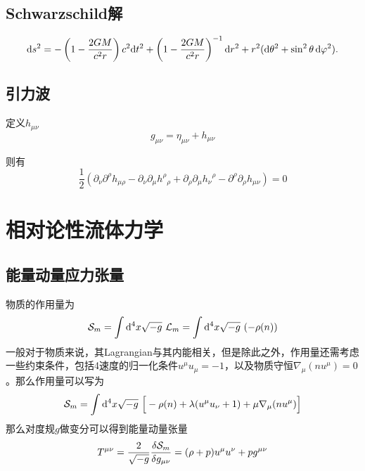 \documentclass[a4paper]{report}
\begin{document}
\section{Schwarzschild解}

\begin{equation}
\mathrm{d} s^2 = -\left(1 - \frac{2GM}{c^2 r}\right) c^2 \mathrm{d} t^2
+ \left(1 - \frac{2GM}{c^2 r}\right)^{-1} \mathrm{d} r^2
+ r^2 (\mathrm{d}\theta^2 + \sin^2\theta\, \mathrm{d}\varphi^2).
\end{equation}

\section{引力波}

定义$h_{\mu\nu}$
\begin{equation}
    g_{\mu\nu} = \eta_{\mu\nu} + h_{\mu\nu}
\end{equation}

则有
\begin{equation}
    \frac{1}{2}({\partial_\nu\partial^\rho h_{\mu\rho}} - {\partial_\nu\partial_\mu {h^\rho}_{\rho}} +{\partial_\rho\partial_\mu {h_\nu}^\rho} -\partial^\rho\partial_\rho h_{\mu\nu})=0
\end{equation}

\chapter{相对论性流体力学}
\section{能量动量应力张量} 
物质的作用量为
\begin{equation}
    \mathcal{S}_m = \int \mathrm{d}^4 x\sqrt{-g}~\mathcal{L}_m = \int \mathrm{d}^4 x\sqrt{-g}~(-\rho(n))
\end{equation}
一般对于物质来说，其Lagrangian与其内能相关，但是除此之外，作用量还需考虑一些约束条件，包括4速度的归一化条件$u^\mu u_\mu = -1$，以及物质守恒$\nabla_\mu(n u^\mu)=0$。那么作用量可以写为
\begin{equation}
    \mathcal{S}_m =  \int \mathrm{d}^4 x\sqrt{-g}~\Big[-\rho(n) +\lambda(u^\mu u_\nu +1) + \mu \nabla_\mu(n u^\mu) \Big]
\end{equation}
那么对度规$g$做变分可以得到能量动量张量
\begin{equation}
    T^{\mu\nu} = \frac{2}{\sqrt{-g}}\frac{\delta \mathcal{S}_m}{\delta g_{\mu\nu}} = (\rho + p)u^\mu u^\nu +p g^{\mu\nu}
\end{equation}
\end{document}
